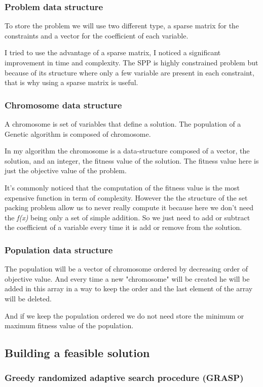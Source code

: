 \documentclass[12pt]{article}
\begin{document}
	\subsubsection{Problem data structure}
	To store the problem we will use two different type, a sparse matrix for the constraints and a vector for the coefficient of each variable.
	
	I tried to use the advantage of a sparse matrix, I noticed a significant improvement in time and complexity. The SPP is highly constrained problem but because of its structure where only a few variable are present in each constraint, that is why using a sparse matrix is useful. 
	\subsubsection{Chromosome data structure}A chromosome is  set of variables that define a solution. The population of a Genetic algorithm is composed of chromosome. 
	
	In my algorithm the chromosome is a data-structure composed of a vector, the solution, and an integer, the fitness value of the solution. The fitness value here is just the objective value of the problem.
	
	It's commonly noticed that the computation of the fitness value is the most expensive function in term of complexity. However the the structure of the set packing problem allow us to never really compute it because here we don't need the \textit{f(x)} being only a set of simple addition. So we just need to add or subtract the coefficient of a variable every time it is add or remove from the solution.
	\subsubsection{Population data structure}
	The population will be a vector of chromosome ordered by decreasing order of objective value.
	And every time a new "chromosome" will be created he will be added in this array in a way to keep the order and the last element of the array will be deleted.
	
	And if we keep the population ordered we do not need store the minimum or maximum fitness value of the population.
	\subsection{Building a feasible solution}
	\subsubsection{Greedy randomized adaptive search procedure (GRASP)}
	
\end{document}
